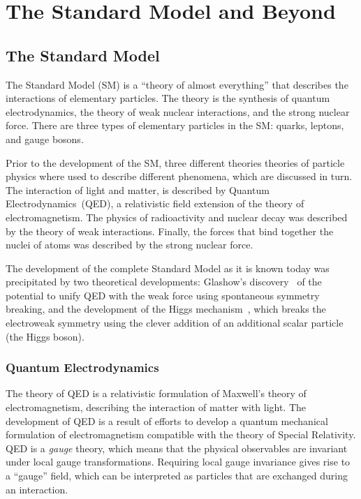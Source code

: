 \ifx\master\undefined\fi

\chapter{The Standard Model and Beyond}
\label{ch:theory}

\section{The Standard Model}

The Standard Model (SM) is a ``theory of almost everything'' that describes the
interactions of elementary particles.  The theory is the synthesis of quantum
electrodynamics, the theory of weak nuclear interactions, and the strong nuclear 
force.  There are three types of elementary particles in the SM: quarks,
leptons, and gauge bosons.  

Prior to the development of the SM, three different theories theories of
particle physics where used to describe different phenomena, which are
discussed in turn.   The interaction of light and matter, is described by
Quantum Electrodynamics~(QED), a relativistic field extension of the theory of
electromagnetism.  The physics of radioactivity and nuclear decay was described
by the theory of weak interactions.  Finally, the forces that bind together the
nuclei of atoms was described by the strong nuclear force. 

The development of the complete Standard Model as it is known today was
precipitated by two theoretical developments:  Glashow's
discovery~\cite{ref:GlashowSymmetryBreaking} of the potential to unify QED with
the weak force using spontaneous symmetry breaking, and the development of the
Higgs mechanism~\cite{ref:HiggsMechanism}, which breaks the electroweak symmetry
using the clever addition of an additional scalar particle (the Higgs boson).

\subsection{Quantum Electrodynamics}

The theory of QED is a relativistic formulation of Maxwell's theory of
electromagnetism, describing the interaction of matter with light.  The
development of QED is a result of efforts to develop a quantum mechanical
formulation of electromagnetism compatible with the theory of Special Relativity.
QED is a \emph{gauge} theory, which means that the physical observables are
invariant under local gauge transformations.  Requiring local gauge
invariance gives rise to a ``gauge'' field, which can be interpreted as 
particles that are exchanged during an interaction.  

